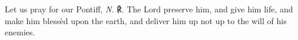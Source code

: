 \begin{otherlanguage}{english} Let us pray for our Pontiff, \textit{N.} ℟. The Lord preserve him, and give him life, and make him blessèd upon the earth, and deliver him up not up to the will of his enemies.
\end{otherlanguage}